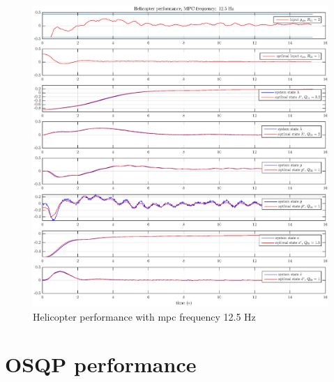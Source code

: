 \begin{figure}
    \centering
    \includegraphics[scale=0.43]{fig/heli_sim_125_15_tune_3.eps}
    \caption{Helicopter performance with \acrshort{mpc} frequency 12.5 Hz}
    \label{fig:heli_sim_125_2}
\end{figure}


\section{OSQP performance}




